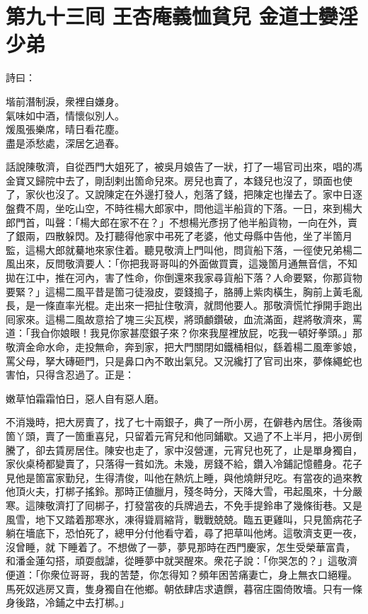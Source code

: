 
\chapter*{第九十三囘 王杏庵義恤貧兒 金道士孌淫少弟}


詩曰：

\begin{myquote}
堦前潛制淚，衆裡自嫌身。\\氣味如中酒，情懷似別人。\\煖風張樂席，晴日看花塵。\\盡是添愁處，深居乞過春。
\end{myquote}

話說陳敬濟，自從西門大姐死了，被吳月娘告了一狀，打了一場官司出來，唱的馮金寶又歸院中去了，剛刮剌出箇命兒來。{}房兒也賣了，本錢兒也沒了，頭面也使了，家伙也沒了。又說陳定在外邊打發人，剋落了錢，把陳定也攆去了。家中日逐盤費不周，坐吃山空，不時徃楊大郎家中，問他這半船貨的下落。一日，來到楊大郎門首，叫聲：「楊大郎在家不在？」不想楊光彥拐了他半船貨物，一向在外，賣了銀兩，四散躲閃。及打聽得他家中弔死了老婆，他丈母縣中告他，坐了半箇月監，這楊大郎就驀地來家住着。聽見敬濟上門叫他，問貨船下落，一徑使兄弟楊二風出來，反問敬濟要人：「你把我哥哥叫的外面做買賣，這幾箇月通無音信，不知拋在江中，推在河內，害了性命，你倒還來我家尋貨船下落？人命要緊，你那貨物要緊？」這楊二風平昔是箇刁徒潑皮，耍錢搗子，胳膊上紫肉橫生，胸前上黃毛亂長，是一條直率光棍。走出來一把扯住敬濟，就問他要人。那敬濟慌忙掙開手跑出囘家來。這楊二風故意拾了塊三尖瓦楔，將頭顱鑽破，血流滿面，趕將敬濟來，罵道：「我㒲你娘眼！我見你家甚麼銀子來？你來我屋裡放屁，吃我一頓好拳頭。」那敬濟金命水命，走投無命，奔到家，把大門關閉如鐵桶相似，繇着楊二風牽爹娘，罵父母，拏大磚砸門，只是鼻口內不敢出氣兒。又況纔打了官司出來，夢條繩蛇也害怕，只得含忍過了。正是：

\begin{myquote}
嫩草怕霜霜怕日，惡人自有惡人磨。
\end{myquote}

不消幾時，把大房賣了，找了七十兩銀子，典了一所小房，在僻巷內居住。落後兩箇丫頭，賣了一箇重喜兒，只留着元宵兒和他同鋪歇。又過了不上半月，把小房倒騰了，卻去賃房居住。陳安也走了，家中沒營運，元宵兒也死了，止是單身獨自，家伙桌椅都變賣了，只落得一貧如洗。{}未幾，房錢不給，鑽入冷鋪記憶體身。花子見他是箇富家勤兒，生得清俊，叫他在熱炕上睡，與他燒餅兒吃。有當夜的過來教他頂火夫，打梆子搖鈴。那時正値臘月，殘冬時分，天降大雪，弔起風來，十分嚴寒。這陳敬濟打了囘梆子，打發當夜的兵牌過去，不免手提鈴串了幾條街巷。又是風雪，地下又踏着那寒氷，凍得聳肩縮背，戰戰兢兢。臨五更雞叫，只見箇病花子躺在墻底下，恐怕死了，總甲分付他看守着，尋了把草叫他烤。這敬濟支更一夜，沒曾睡，就𢱉下睡着了。不想做了一夢，夢見那時在西門慶家，怎生受榮華富貴，和潘金蓮勾搭，頑耍戲謔，從睡夢中就哭醒來。衆花子說：「你哭怎的？」這敬濟便道：「你衆位哥哥，我的苦楚，你怎得知？頻年困苦痛妻亡，身上無衣口絕糧。馬死奴逃房又賣，隻身獨自在他鄉。朝依肆店求遺饌，暮宿庄園倚敗墻。只有一條身後路，冷鋪之中去打梆。」

